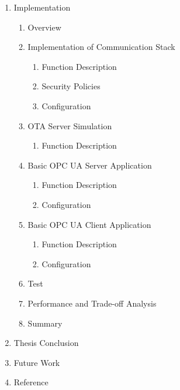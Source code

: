 \documentclass[]{llncs}
\begin{document}
\begin{enumerate}
	\item Implementation 
  	\begin{enumerate}[label*=\arabic*.]
	\item Overview
    	\item Implementation of Communication Stack
		\begin{enumerate}[label*=\arabic*.]
		\item Function Description
		\item Security Policies
		\item Configuration
		\end{enumerate}
    	\item OTA Server Simulation 
		\begin{enumerate}[label*=\arabic*.]
		\item Function Description
		\end{enumerate}
    	\item Basic OPC UA Server Application
		\begin{enumerate}[label*=\arabic*.]
		\item Function Description
		\item Configuration
		\end{enumerate}
    	\item Basic OPC UA Client Application
		\begin{enumerate}[label*=\arabic*.]
		\item Function Description
		\item Configuration
		\end{enumerate}
    	\item Test
    	\item Performance and Trade-off Analysis
    	\item Summary
	\end{enumerate}
	\item Thesis Conclusion
	\item Future Work
	\item Reference
\end{enumerate}
\end{document}
